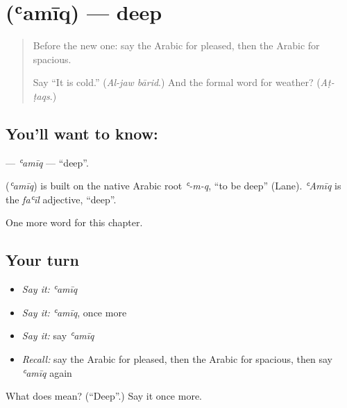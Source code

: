 \section[\texorpdfstring{\ar{عميق} (ʿamīq)}{عميق (ʿamīq)}]{ (ʿamīq) — deep}

\label{lesson:AR-C148-amiq}



\begin{quote}
Before the new one: say the Arabic for pleased, then the Arabic for spacious.

Say \textquotedblleft{}It is cold.\textquotedblright{} (\emph{Al-jaw bārid}.) And the formal word for weather? (\emph{Aṭ-ṭaqs}.)
\end{quote}

\subsection*{You'll want to know: }
\textbf{} — \emph{ʿamīq} — \textquotedblleft{}deep\textquotedblright{}.

\begin{cousinweb}
\textbf{} (\emph{ʿamīq}) is built on the native Arabic root \emph{ʿ-m-q}, \textquotedblleft{}to be deep\textquotedblright{} (Lane). \emph{ʿAmīq} is the \emph{faʿīl} adjective, \textquotedblleft{}deep\textquotedblright{}.
\end{cousinweb}

\begin{grammarlens}[title={What you've built}]
One more word for this chapter.
\end{grammarlens}

\subsection*{Your turn}
\begin{itemize}
\raggedright
  \item \emph{Say it:} \emph{ʿamīq}
  \item \emph{Say it:} \emph{ʿamīq}, once more
  \item \emph{Say it:} say \emph{ʿamīq}
  \item \emph{Recall:} say the Arabic for pleased, then the Arabic for spacious, then say \emph{ʿamīq} again
\end{itemize}

\begin{tcolorbox}[breakable,colback=teal!4,colframe=teal!35!black,title={Before you move on}]
What does  mean? (\textquotedblleft{}Deep\textquotedblright{}.) Say it once more.
\end{tcolorbox}
